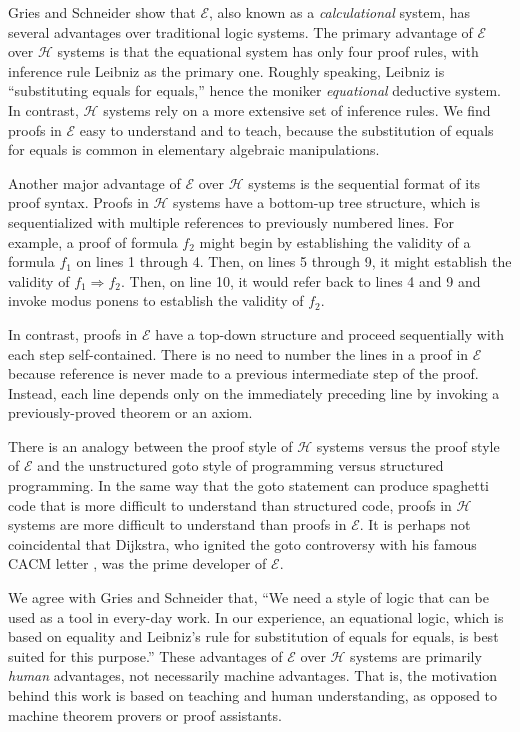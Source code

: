 \documentclass[12pt, fleqn, leqno]{article}
\newcommand{\impl}{\ensuremath{\Rightarrow}}        %
\begin{document}
Gries and Schneider \cite{Gries1995, Gries1995145} show that $\mathcal{E}$, also known as a \textit{calculational} system, has several advantages over traditional logic systems.
The primary advantage of $\mathcal{E}$ over $\mathcal{H}$ systems is that the equational system has only four proof rules, with inference rule Leibniz as the primary one.
Roughly speaking, Leibniz is ``substituting equals for equals,'' hence the moniker \textit{equational} deductive system.
In contrast, $\mathcal{H}$ systems rely on a more extensive set of inference rules.
We find proofs in $\mathcal{E}$ easy to understand and to teach, because the substitution of equals for equals is common in elementary algebraic manipulations.

Another major advantage of $\mathcal{E}$ over $\mathcal{H}$ systems is the sequential format of its proof syntax.
Proofs in $\mathcal{H}$ systems have a bottom-up tree structure, which is sequentialized with multiple references to previously numbered lines.
For example, a proof of formula $f_2$ might begin by establishing the validity  of a formula $f_1$ on lines 1 through 4.
Then, on lines 5 through 9, it might establish the validity of $f_1\impl f_2$.
Then, on line 10, it would refer back to lines 4 and 9 and invoke modus ponens to establish the validity of $f_2$.

In contrast, proofs in $\mathcal{E}$ have a top-down structure and proceed sequentially with each step self-contained.
There is no need to number the lines in a proof in $\mathcal{E}$ because reference is never made to a previous intermediate step of the proof.
Instead, each line depends only on the immediately preceding line by invoking a previously-proved theorem or an axiom.

There is an analogy between the proof style of $\mathcal{H}$ systems versus the proof style of $\mathcal{E}$ and the unstructured goto style of programming versus structured programming.
In the same way that the goto statement can produce spaghetti code that is more difficult to understand than structured code, proofs in $\mathcal{H}$ systems are more difficult to understand than proofs in $\mathcal{E}$.
It is perhaps not coincidental that Dijkstra, who ignited the goto controversy with his famous CACM letter \cite{Dijkstra:1968:LEG:362929.362947}, was the prime developer of $\mathcal{E}$.

We agree with Gries and Schneider \cite{LADM} that, ``We need a style of logic that can be used as a tool in every-day work.
In our experience, an equational logic, which is based on equality and Leibniz's rule for substitution of equals for equals, is best suited for this purpose.''
These advantages of $\mathcal{E}$ over $\mathcal{H}$ systems are primarily \textit{human} advantages, not necessarily machine advantages.
That is, the motivation behind this work is based on teaching and human understanding, as opposed to machine theorem provers or proof assistants.
\end{document}
